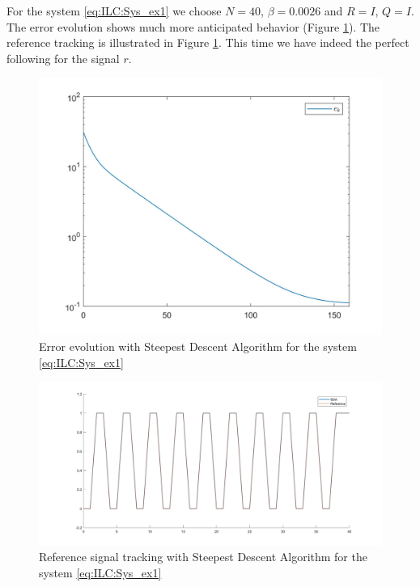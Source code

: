 \begin{exam}
	For the system \eqref{eq:ILC:Sys_ex1} we choose $N = 40$, $\beta = 0.0026$ and $R = I$, $Q = I$. The error evolution shows much more anticipated behavior (Figure \ref{img:ILC:SDA_N40}). The reference tracking is illustrated in Figure \ref{img:ILC:SDA_N40}. This time we have indeed the perfect following for the signal $r$. 
	
	\begin{figure}[ht]
		\centering
		\includegraphics[width=\textwidth]{fig/SDA_N40.jpg}
		\caption{Error evolution with Steepest Descent Algorithm for the system \eqref{eq:ILC:Sys_ex1}}
		\label{img:ILC:SDA_N40}
	\end{figure}

	\begin{figure}[ht]
		\centering
	\includegraphics[width=\textwidth]{fig/SDA_N40_output.jpg}
	\caption{Reference signal tracking with Steepest Descent Algorithm for the system \eqref{eq:ILC:Sys_ex1}}
	\label{img:ILC:SDA_N40_output}
\end{figure}
\end{exam}


